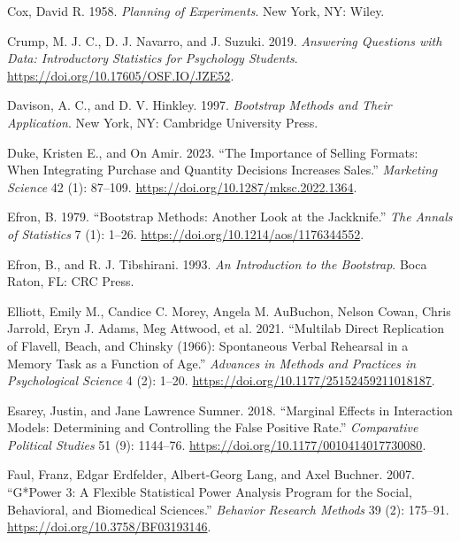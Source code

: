 \documentclass[
  11pt,
  letterpaper,
]{scrbook}
\newlength{\cslhangindent}
\newenvironment{CSLReferences}[2] %
 {\begin{list}{}{%
  \setlength{\itemindent}{0pt}
  \setlength{\leftmargin}{0pt}
  \setlength{\parsep}{0pt}
  \ifodd #1
   \setlength{\leftmargin}{\cslhangindent}
   \setlength{\itemindent}{-1\cslhangindent}
  \fi
  \setlength{\itemsep}{#2\baselineskip}}}
 {\end{list}}
\theoremstyle{definition}
\theoremstyle{definition}
\theoremstyle{remark}
\begin{document}
\begin{CSLReferences}{1}{0}
Cox, David R. 1958. \emph{Planning of Experiments}. New York, NY: Wiley.

Crump, M. J. C., D. J. Navarro, and J. Suzuki. 2019. \emph{Answering
Questions with Data: Introductory Statistics for Psychology Students}.
\url{https://doi.org/10.17605/OSF.IO/JZE52}.

Davison, A. C., and D. V. Hinkley. 1997. \emph{Bootstrap Methods and
Their Application}. New York, NY: Cambridge University Press.

Duke, Kristen E., and On Amir. 2023. {``The Importance of Selling
Formats: When Integrating Purchase and Quantity Decisions Increases
Sales.''} \emph{Marketing Science} 42 (1): 87--109.
\url{https://doi.org/10.1287/mksc.2022.1364}.

Efron, B. 1979. {``Bootstrap Methods: Another Look at the Jackknife.''}
\emph{The Annals of Statistics} 7 (1): 1--26.
\url{https://doi.org/10.1214/aos/1176344552}.

Efron, B., and R. J. Tibshirani. 1993. \emph{An Introduction to the
Bootstrap}. Boca Raton, FL: CRC Press.

Elliott, Emily M., Candice C. Morey, Angela M. AuBuchon, Nelson Cowan,
Chris Jarrold, Eryn J. Adams, Meg Attwood, et al. 2021. {``Multilab
Direct Replication of {F}lavell, {B}each, and {C}hinsky (1966):
Spontaneous Verbal Rehearsal in a Memory Task as a Function of Age.''}
\emph{Advances in Methods and Practices in Psychological Science} 4 (2):
1--20. \url{https://doi.org/10.1177/25152459211018187}.

Esarey, Justin, and Jane Lawrence Sumner. 2018. {``Marginal Effects in
Interaction Models: Determining and Controlling the False Positive
Rate.''} \emph{Comparative Political Studies} 51 (9): 1144--76.
\url{https://doi.org/10.1177/0010414017730080}.

Faul, Franz, Edgar Erdfelder, Albert-Georg Lang, and Axel Buchner. 2007.
{``{G*Power 3}: A Flexible Statistical Power Analysis Program for the
Social, Behavioral, and Biomedical Sciences.''} \emph{Behavior Research
Methods} 39 (2): 175--91. \url{https://doi.org/10.3758/BF03193146}.


\end{CSLReferences}
\end{document}
